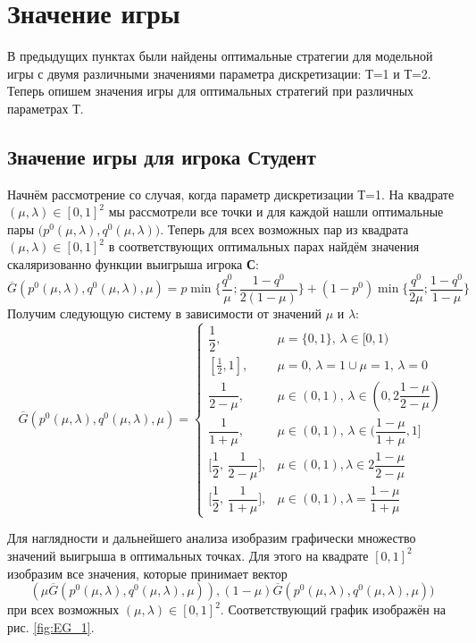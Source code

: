 \section{Значение игры}

\qquad В предыдущих пунктах были найдены оптимальные стратегии для 
модельной игры с двумя различными значениями параметра дискретизации:
Т=1 и Т=2. Теперь опишем значения игры для оптимальных стратегий при
различных параметрах Т.

\subsection{Значение игры для игрока Студент}

\qquad Начнём рассмотрение со случая, когда параметр дискретизации
Т=1. На квадрате $(\mu, \lambda) \in [0, 1]^2$ мы рассмотрели
все точки и для каждой нашли оптимальные пары 
$\big(p^0(\mu, \lambda), q^0(\mu, \lambda)\big)$.
Теперь для всех возможных пар из квадрата
$(\mu, \lambda) \in [0, 1]^2$ в соответствующих
оптимальных парах найдём значения скаляризованно функции выигрыша 
игрока \textbf{С}:
$$
	\overline G(p^0(\mu, \lambda), q^0(\mu, \lambda), \mu)=
	p \min \Big\{
		\dfrac{q^0}{\mu};
		\dfrac{1-q^0}{2(1-\mu)}
	\Big\} + (1 - p^0) \min \Big\{
		\dfrac{q^0}{2\mu};
		\dfrac{1 - q^0}{1 - \mu}
	\Big\}
$$
Получим следующую систему в зависимости от значений  $\mu$ и $\lambda$:
$$
	\overline G(p^0(\mu, \lambda), q^0(\mu, \lambda), \mu) =
	\begin{cases}
		\dfrac{1}{2}, & 
		\mu = \{0,1\}, \, \lambda \in [0, 1) 
		\\	
		[\frac{1}{2}, 1], & 
		\mu = 0, \, \lambda = 1 \cup 
		\mu = 1, \, \lambda = 0
		\\
		\dfrac{1}{2-\mu}, &	
		\mu \in (0, 1), \, \lambda \in 
		(0, 2\dfrac{1 - \mu}{2 - \mu})
		\\
		\dfrac{1}{1 + \mu}, & 
		\mu \in (0, 1), \, \lambda \in 
		(\dfrac{1 - \mu}{1 + \mu}, 1]
		\\
		\Big[\dfrac{1}{2}, \, \dfrac{1}{2-\mu}\Big], &
		\mu \in (0, 1), \lambda \in 2\dfrac{1 - \mu}{2 - \mu}
		\\ 
		\Big[\dfrac{1}{2}, \, \dfrac{1}{1+\mu}\Big], &
		\mu \in (0,1), \lambda = \dfrac{1-\mu}{1+\mu}
	\end{cases}
$$

Для наглядности и дальнейшего анализа изобразим графически множество
значений выигрыша в оптимальных точках.
Для этого на квадрате $[0, 1]^{2}$ изобразим все значения, которые 
принимает вектор 
$$
	(\mu \overline G(p^0(\mu, \lambda), q^0(\mu, \lambda), \mu)), 
	(1-\mu) \overline G(p^0(\mu, \lambda), q^0(\mu, \lambda), \mu))
$$ 
при всех возможных $(\mu, \lambda) \in [0, 1]^2$. Соответствующий график
изображён на\\ рис. \ref{fig:EG_1}.

